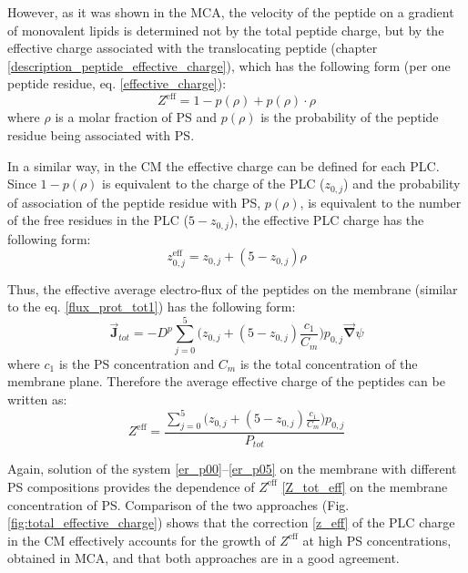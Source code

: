 However, as it was shown in the MCA, the velocity of the peptide on a gradient of monovalent lipids is determined not by the total peptide charge, but by the effective charge associated with the translocating peptide (chapter \ref{description_peptide_effective_charge}), which has the following form (per one peptide residue, eq. \eqref{effective_charge}):
\begin{equation}
\label{effective_charge_CM}
 Z^{\text{eff}} = 1-p(\rho) + p(\rho)\cdot \rho
\end{equation}
where $\rho$ is a molar fraction of PS and $p(\rho)$ is the probability of the peptide residue being associated with PS.

In a similar way, in the CM the effective charge can be defined for each PLC. Since $1-p(\rho)$ is equivalent to the charge of the PLC ($z_{0,j}$) and the probability of association of the peptide residue with PS, $p(\rho)$, is equivalent to the number of the free residues in the PLC ($5 - z_{0,j}$), the effective PLC charge has the following form:
\begin{equation}
 \label{z_eff}z_{0,j}^{\text{eff}} = z_{0,j} + (5 - z_{0,j})\rho
\end{equation}

Thus, the effective average electro-flux of the peptides on the membrane (similar to the eq. \eqref{flux_prot_tot1}) has the following form:
\begin{equation}
\label{flux_prot_eff}\vec{\mathbf{J}}_{tot}=-D^p\sum_{j=0}^5\Big(z_{0,j} + (5 - z_{0,j})\frac{c_1}{C_m}\Big) p_{0,j} \vec{\mathbf{\nabla}}\psi
\end{equation}
where $c_1$ is the PS concentration and $C_m$ is the total concentration of the membrane plane. Therefore the average effective charge of the peptides can be written as:
\begin{equation}
 \label{Z_tot_eff}Z^{\text{eff}} = \frac{\sum_{j=0}^5 \big(z_{0,j} + (5 - z_{0,j})\frac{c_1}{C_m}\big) p_{0,j}}{P_{tot}}
\end{equation}

Again, solution of the system \eqref{er_p00}--\eqref{er_p05} on the membrane with different PS compositions provides the dependence of $Z^{\text{eff}}$ \eqref{Z_tot_eff} on the membrane concentration of PS. Comparison of the two approaches (Fig. \ref{fig:total_effective_charge}) shows that the correction \eqref{z_eff} of the PLC charge in the CM effectively accounts for the growth of $Z^{\text{eff}}$ at high PS concentrations, obtained in MCA, and that both approaches are in a good agreement.

